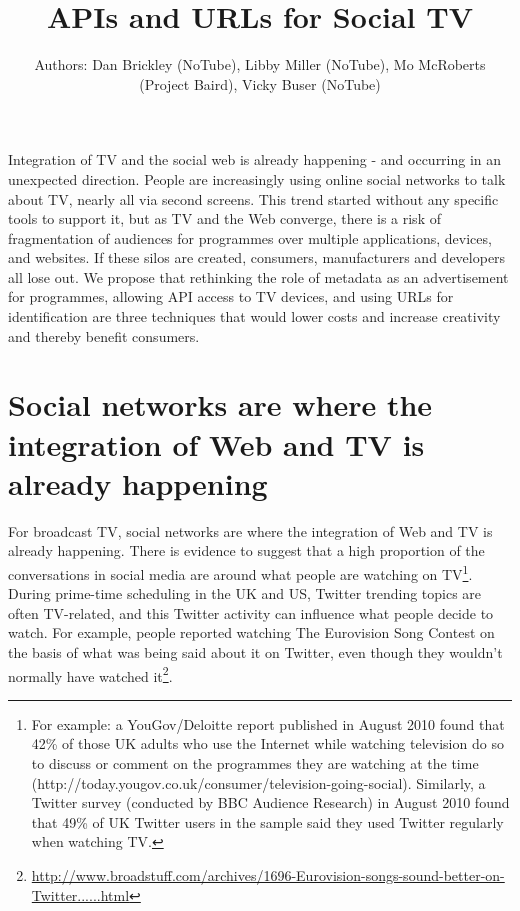 \documentclass[]{article}%
\title{APIs and URLs for Social TV}
\author{Authors: Dan Brickley (NoTube),  Libby Miller (NoTube), Mo McRoberts (Project Baird), Vicky Buser (NoTube)}
\begin{document}
\ifpdf
{}
\else
{}
\fi

\maketitle

Integration of TV and the social web is already happening - and occurring in an unexpected direction. People are increasingly using online social networks to talk about TV, nearly all via second screens. This trend started without any specific tools to support it, but as TV and the Web converge, there is a risk of fragmentation of audiences for programmes over multiple applications, devices, and websites. If these silos are created, consumers, manufacturers and developers all lose out. We propose that rethinking the role of metadata as an advertisement for programmes, allowing API access to TV devices, and using URLs for identification are three techniques that would lower costs and increase creativity and thereby benefit consumers.


\section{Social networks are where the integration of Web and TV is already happening}

For broadcast TV, social networks are where the integration of Web and TV is already happening. There is evidence to suggest that a high proportion of the conversations in social media are around what people are watching on TV\footnote{For example: a YouGov/Deloitte report published in August 2010 found that 42\% of those UK adults who use the Internet while watching television do so to discuss or comment on the programmes they are watching at the time (http://today.yougov.co.uk/consumer/television-going-social). Similarly, a Twitter survey (conducted by BBC Audience Research) in August 2010 found that 49\% of UK Twitter users in the sample said they used Twitter regularly when watching TV.}. During prime-time scheduling in the UK and US, Twitter trending topics are often TV-related, and this Twitter activity can influence what people decide to watch. For example, people reported watching The Eurovision Song Contest on the basis of what was being said about it on Twitter, even though they wouldn't normally have watched it\footnote{\url{http://www.broadstuff.com/archives/1696-Eurovision-songs-sound-better-on-Twitter......html}}. 
\end{document}
